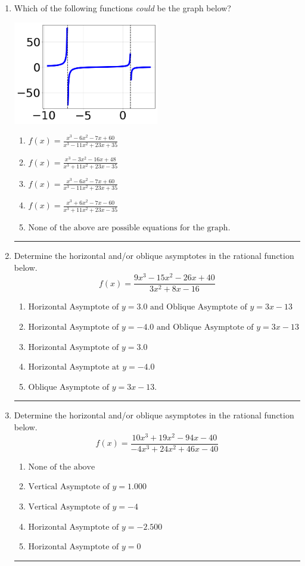 \documentclass[14pt]{extbook}
\newcommand{\litem}[1]{\item#1\hspace*{-1cm}\rule{\textwidth}{0.4pt}}
\begin{document}
\begin{enumerate}
{\begin{enumerate}[label=\Alph*.]
\end{enumerate} }
\litem{
Which of the following functions \textit{could} be the graph below?
\begin{center}
    \includegraphics[width=0.5\textwidth]{../Figures/identifyGraphOfRationalFunctionB.png}
\end{center}
\begin{enumerate}[label=\Alph*.]
\item \( f(x)=\frac{x^{3} -6 x^{2} -7 x + 60}{x^{3} -11 x^{2} +23 x + 35} \)
\item \( f(x)=\frac{x^{3} -3 x^{2} -16 x + 48}{x^{3} +11 x^{2} +23 x -35} \)
\item \( f(x)=\frac{x^{3} -6 x^{2} -7 x + 60}{x^{3} -11 x^{2} +23 x + 35} \)
\item \( f(x)=\frac{x^{3} +6 x^{2} -7 x -60}{x^{3} +11 x^{2} +23 x -35} \)
\item \( \text{None of the above are possible equations for the graph.} \)

\end{enumerate} }
\litem{
Determine the horizontal and/or oblique asymptotes in the rational function below.\[ f(x) = \frac{9x^{3} -15 x^{2} -26 x + 40}{3x^{2} +8 x -16} \]\begin{enumerate}[label=\Alph*.]
\item \( \text{Horizontal Asymptote of } y = 3.0 \text{ and Oblique Asymptote of } y = 3x -13 \)
\item \( \text{Horizontal Asymptote of } y = -4.0 \text{ and Oblique Asymptote of } y = 3x -13 \)
\item \( \text{Horizontal Asymptote of } y = 3.0  \)
\item \( \text{Horizontal Asymptote at } y = -4.0 \)
\item \( \text{Oblique Asymptote of } y = 3x -13. \)

\end{enumerate} }
\litem{
Determine the horizontal and/or oblique asymptotes in the rational function below.\[ f(x) = \frac{10x^{3} +19 x^{2} -94 x -40}{-4x^{3} +24 x^{2} +46 x -40} \]\begin{enumerate}[label=\Alph*.]
\item \( \text{None of the above} \)
\item \( \text{Vertical Asymptote of } y = 1.000  \)
\item \( \text{Vertical Asymptote of } y = -4  \)
\item \( \text{Horizontal Asymptote of } y = -2.500  \)
\item \( \text{Horizontal Asymptote of } y = 0  \)


\end{enumerate}}
\end{enumerate}
\end{document}

